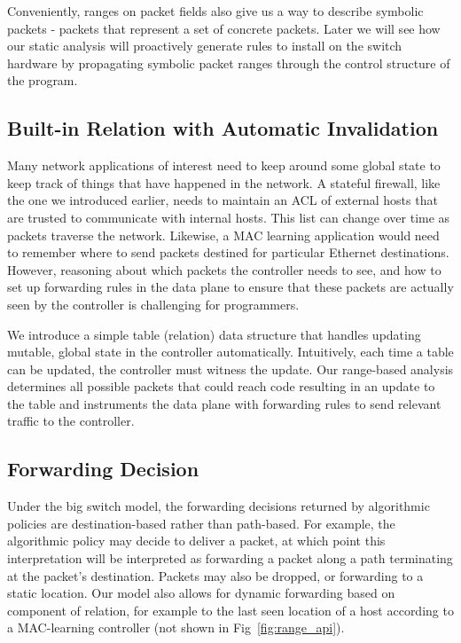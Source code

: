 \documentclass[preprint]{sigplanconf}
\begin{document}
Conveniently, ranges on packet fields also give us a way to describe symbolic packets - packets that represent a set of concrete packets. Later we will see how our static analysis will proactively generate rules to install on the switch hardware by propagating symbolic packet ranges through the control structure of the program.



     \subsection*{Built-in Relation with Automatic Invalidation}
	Many network applications of interest need to keep around some global state to keep track of things that have happened in the network. A stateful firewall, like the one we introduced earlier, needs to maintain an ACL of external hosts that are trusted to communicate with internal hosts. This list can change over time as packets traverse the network. Likewise, a MAC learning application would need to remember where to send packets destined for particular Ethernet destinations. However, reasoning about which packets the controller needs to see, and how to set up forwarding rules in the data plane to ensure that these packets are actually seen by the controller is challenging for programmers.
	
	We introduce a simple table (relation) data structure that handles updating mutable, global state in the controller automatically. Intuitively, each time a table can be updated, the controller must witness the update. Our range-based analysis determines all possible packets that could reach code resulting in an update to the table and instruments the data plane with forwarding rules to send relevant traffic to the controller.

   

     
  

   \subsection*{Forwarding Decision}
   Under the big switch model, the forwarding decisions returned by algorithmic policies are destination-based rather than path-based. For example, the algorithmic policy may decide to deliver a packet, at which point this interpretation will be interpreted as forwarding a packet along a path terminating at the packet's destination. Packets may also be dropped, or forwarding to a static location. Our model also allows for dynamic forwarding based on component of relation, for example to the last seen location of a host according to a MAC-learning controller (not shown in Fig~\ref{fig:range_api}).
   
\end{document}

